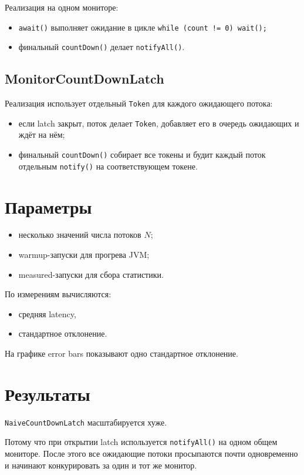 \documentclass[12pt]{article}
\begin{document}
Реализация на одном мониторе:
\begin{itemize}
    \item \texttt{await()} выполняет ожидание в цикле \texttt{while (count != 0) wait();}
    \item финальный \texttt{countDown()} делает \texttt{notifyAll()}.
\end{itemize}

\subsection*{MonitorCountDownLatch}

Реализация использует отдельный  \texttt{Token} для каждого ожидающего потока:
\begin{itemize}
    \item если latch закрыт, поток делает \texttt{Token}, добавляет его в очередь ожидающих и ждёт на нём;
    \item финальный \texttt{countDown()} собирает все токены и будит каждый поток отдельным \texttt{notify()} на соответствующем токене.
\end{itemize}

\section*{Параметры}

\begin{itemize}
    \item несколько значений числа потоков $N$;
    \item warmup-запуски для прогрева JVM;
    \item measured-запуски для сбора статистики.
\end{itemize}

По измерениям вычисляются:
\begin{itemize}
    \item средняя latency,
    \item стандартное отклонение.
\end{itemize}

На графике error bars показывают одно стандартное отклонение.

\section*{Результаты}

\texttt{NaiveCountDownLatch} масштабируется хуже.

Потому что при открытии latch используется \texttt{notifyAll()} на одном общем мониторе. После этого все ожидающие потоки просыпаются почти одновременно и начинают конкурировать за один и тот же монитор.
\end{document}
